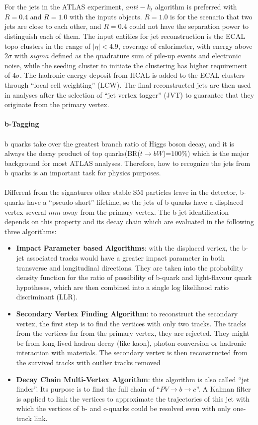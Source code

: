 \\
\\For the jets in the ATLAS experiment, $anti-k_{t}$ algorithm is preferred with $R=0.4$ and $R=1.0$ with the inputs objects. $R=1.0$ is for the scenario that two jets are close to each other, and $R=0.4$ could not have the separation power to distinguish each of them. The input entities for jet reconstruction is the ECAL topo clusters in the range of $|\eta|<4.9$, coverage of calorimeter, with energy above $2\sigma$ with $sigma$ defined as the quadrature sum of pile-up events and electronic noise, while the seeding cluster to initiate the clustering has higher requirement of $4\sigma$. The hadronic energy deposit from HCAL is added to the ECAL clusters through ``local cell weighting'' (LCW). The final reconstructed jets are then used in analyses after the selection of ``jet vertex tagger'' (JVT) to guarantee that they originate from the primary vertex. 
\\
\\{\bf b-Tagging}
\\
\\b quarks take over the greatest branch ratio of Higgs boson decay, and it is always the decay product of top quarks(BR($t \rightarrow bW$)=$100\%$) which is the major background for most ATLAS analyses. Therefore, how to recognize the jets from b quarks is an important task for physics purposes.
\\
\\Different from the signatures other stable SM particles leave in the detector, b-quarks have a ``pseudo-short'' lifetime, so the jets of b-quarks have a displaced vertex several $mm$ away from the primary vertex. The b-jet identification depends on this property and its decay chain which are evaluated in the following three algorithms:
\begin{itemize}
	\item {\bf Impact Parameter based Algorithms}: with the displaced vertex, the b-jet associated tracks would have a greater impact parameter in both transverse and longitudinal directions. They are taken into the probability density function for the ratio of possibility of b-quark and light-flavour quark hypotheses, which are then combined into a single log likelihood ratio discriminant (LLR).
	\item {\bf Secondary Vertex Finding Algorithm}: to reconstruct the secondary vertex, the first step is to find the vertices with only two tracks. The tracks from the vertices far from the primary vertex, they are rejected. They might be from long-lived hadron decay (like kaon), photon conversion or hadronic interaction with materials.  The secondary vertex is then reconstructed from the survived tracks with outlier tracks removed
	\item {\bf Decay Chain Multi-Vertex Algorithm}: this algorithm is also called ``jet finder''. Its purpose is to find the full chain of ``$PV \rightarrow b \rightarrow c$''. A Kalman filter is applied to link the vertices to approximate the trajectories of this jet with which the vertices of b- and c-quarks could be resolved even with only one-track link.  
\end{itemize}
